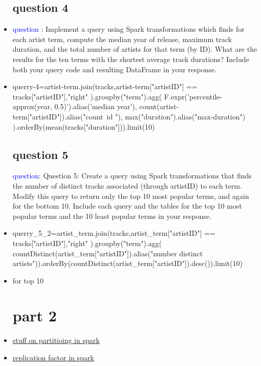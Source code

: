\documentclass{article}
\begin{document}
\begin{itemize}
\subsection*{question 4}
\item \textcolor{blue}{question }: Implement a query using Spark transformations which finds for each artist term, compute the median year of release, maximum track duration, and the total number of artists for that term (by ID). What are the results for the ten terms with the shortest average track durations? Include both your query code and resulting DataFrame in your response.
\item  querry-4=artist-term.join(tracks,artist-term["artistID"] == tracks["artistID"],"right" ).groupby("term").agg(
                                            F.expr('percentile-approx(year, 0.5)').alias('median year'),
                                             count(artist-term["artistID"]).alias("count\ id "), max("duration").alias("max-duration") ).orderBy(mean(tracks["duration"])).limit(10)

\subsection*{question 5}
\textcolor{blue}{question}: Question 5: Create a query using Spark transformations that finds the number of distinct tracks associated (through artistID) to each term. Modify this query to return only the top 10 most popular terms, and again for the bottom 10. Include each query and the tables for the top 10 most popular terms and the 10 least popular terms in your response.
\item querry\_5\_2=artist\_term.join(tracks,artist\_term["artistID"] == tracks["artistID"],"right" ).groupby("term").agg( countDistinct(artist\_term["artistID"]).alias("number distinct artists")).orderBy(countDistinct(artist\_term["artistID"]).desc()).limit(10) 
\item for top 10 
    
\section*{part 2}
\item \href{https://sparkbyexamples.com/spark/spark-partitioning-understanding/}{stuff on partitioing in spark}
\item \href{https://understandingbigdata.com/hdfs-what-is-replication-factor-in-hdfs-and-can-we-change-it/}{replication factor in spark}




\end{itemize}
\end{document}
